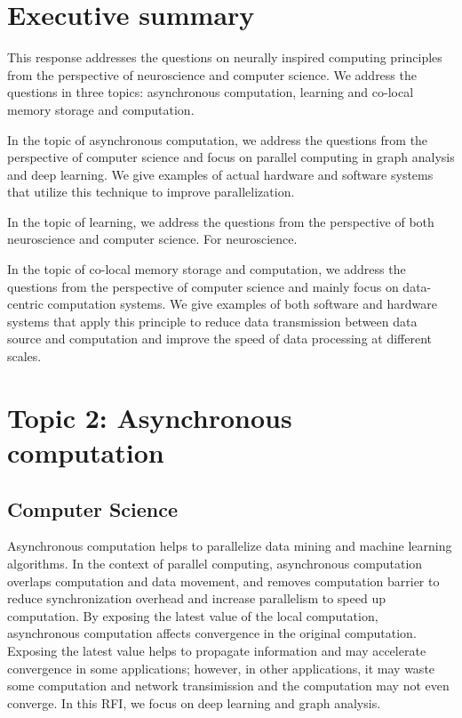 \documentclass[12pt]{report}
\begin{document}

\section*{Executive summary}
This response addresses the questions on neurally inspired computing principles
from the perspective of neuroscience and computer science. We address
the questions in three topics: asynchronous computation, learning and co-local
memory storage and computation.

In the topic of asynchronous computation, we address the questions from
the perspective of computer science and focus on parallel computing in graph
analysis and deep learning. We give examples of actual hardware and software
systems that utilize this technique to improve parallelization.

In the topic of learning, we address the questions from the perspective of
both neuroscience and computer science. For neuroscience.

In the topic of co-local memory storage and computation, we address
the questions from the perspective of computer science and mainly focus on
data-centric computation systems. We give examples of both software and
hardware systems that apply this principle to reduce data transmission between
data source and computation and improve the speed of data processing at
different scales.

\newpage

\section*{Topic 2: Asynchronous computation}

\subsection{Computer Science}

Asynchronous computation helps to parallelize data mining and machine learning
algorithms. In the context of parallel computing, asynchronous computation
overlaps computation and data movement, and removes computation barrier to
reduce synchronization
overhead and increase parallelism to speed up computation. By exposing
the latest value of the local computation, asynchronous computation affects
convergence in the original computation. Exposing the latest value helps to
propagate information and may accelerate convergence in some applications;
however, in other applications, it may waste some computation and network
transimission and the computation may not even converge. In this RFI, we
focus on deep learning and graph analysis.
\end{document}
